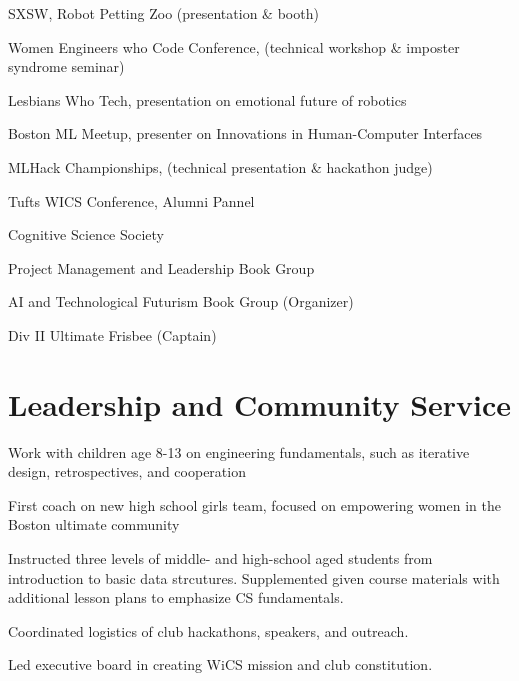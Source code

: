 \documentclass[]{csaund_resume-openfont}
\begin{document}
\descript {}
\begin{tightemize}
\item SXSW, Robot Petting Zoo (presentation \& booth)
\item Women Engineers who Code Conference, (technical workshop \& imposter syndrome seminar)
\item Lesbians Who Tech, presentation on emotional future of robotics 
\item Boston ML Meetup, presenter on Innovations in Human-Computer Interfaces
\item MLHack Championships, (technical presentation \& hackathon judge)
\item Tufts WICS Conference, Alumni Pannel 
\end{tightemize}
\sectionsep

\descript{ }
\begin{tightemize}
\item Cognitive Science Society
\item Project Management and Leadership Book Group 
\item AI and Technological Futurism Book Group (Organizer)
\item Div II Ultimate Frisbee (Captain)
\end{tightemize}
\sectionsep


\section{Leadership and Community Service}
Work with children age 8-13 on engineering fundamentals, such as iterative design, retrospectives, and cooperation
\sectionsep

First coach on new high school girls team, focused on empowering women in the Boston ultimate community
\sectionsep

Instructed three levels of middle- and high-school aged students from introduction to basic data strcutures. Supplemented given course materials with additional lesson plans to emphasize CS fundamentals.
\sectionsep

\begin{tightemize}
\item Coordinated logistics of club hackathons, speakers, and outreach.
\item Led executive board in creating WiCS mission and club constitution.
\end{tightemize}
\sectionsep
\end{document}
